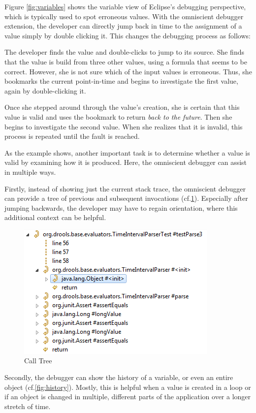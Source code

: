 \documentclass[english]{scrartcl}
\begin{document}
Figure \ref{fig:variables} shows the variable view of Eclipse's debugging perspective, which is typically used to spot erroneous values.
With the omniscient debugger extension, the developer can directly jump back in time to the assignment of a value simply by double clicking it.
This changes the debugging process as follows:

The developer finds the value and double-clicks to jump to its source.
She finds that the value is build from three other values, using a formula that seems to be correct.
However, she is not sure which of the input values is erroneous.
Thus, she bookmarks the current point-in-time and begins to investigate the first value, again by double-clicking it.

Once she stepped around through the value's creation, she is certain that this value is valid and uses the bookmark to return \emph{back to the future}.
Then she begins to investigate the second value.
When she realizes that it is invalid, this process is repeated until the fault is reached.

As the example shows, another important task is to determine whether a value is valid by examining how it is produced.
Here, the omniscient debugger can assist in multiple ways.

Firstly, instead of showing just the current stack trace, the omniscient debugger can provide a tree of previous and subsequent invocations (cf.\cref{fig:tree}).
Especially after jumping backwards, the developer may have to regain orientation, where this additional context can be helpful.

\begin{figure}[ht]
\centering
\includegraphics[width=.55\textwidth]{img/tree.png}
\caption{Call Tree}
\label{fig:tree}
\end{figure}

Secondly, the debugger can show the history of a variable, or even an entire object (cf.\cref{fig:history}).
Mostly, this is helpful when a value is created in a loop or if an object is changed in multiple, different parts of the application over a longer stretch of time.
\end{document}
